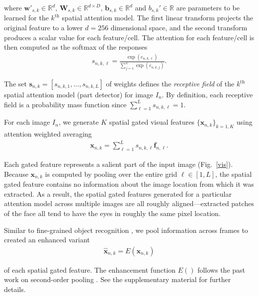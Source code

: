\noindent where $\mathbf{w}'_{s,k} \in \mathbb{R}^{d}$, $\mathbf{W}_{s,k} \in \mathbb{R}^{d \times D}$, $\mathbf{b}_{s,k} \in \mathbb{R}^{d}$ and $b_{s,k}' \in \mathbb{R}$ are parameters to be learned for the $k^\text{th}$ spatial attention model. The first linear transform projects the original feature to a lower $d=256$ dimensional space, and the second transform produces a scalar value for each feature/cell. The attention for each feature/cell is then computed as the softmax of the responses
%
\begin{align}
s_{n,k,\ell} = \frac{\exp(e_{n,k,\ell})}{\sum_{j=1}^L \exp(e_{n,k,j})}.
\end{align}


The set $\mathbf{s}_{n,k} = [ s_{n,k,1}, \ldots, s_{n,k,L}]$ of weights defines the \textit{receptive field} of the $k^\text{th}$ spatial attention model (part detector) for image $I_n$. By definition, each receptive field is a probability mass function since $\sum_{\ell=1}^{L} s_{n,k,\ell} = 1$.  %


For each image $I_n$, we generate $K$ spatial gated visual features $\{ \mathbf{x}_{n,k} \}_{k=1,K}$ using attention weighted averaging
\begin{align}
   \mathbf{x}_{n,k} = \sum_{\ell=1}^L s_{n,k,\ell} \mathbf{f}_{n,\ell}.
\label{eqn:spatial-attention}
\end{align}

\noindent Each gated feature represents a salient part of the input image (Fig.~\ref{vis}).  Because $\mathbf{x}_{n,k}$ is computed by pooling over the entire grid $\ell \in [1,L]$, the spatial gated feature contains no information about the image location from which it was extracted.  As a result, the spatial gated features generated for a particular attention model across multiple images are all roughly aligned---\eg extracted patches of the face all tend to have the eyes in roughly the same pixel location.

Similar to fine-grained object recognition \cite{lin2017bilinear}, we pool information across frames to created an enhanced variant 
%
\begin{align}
\widehat{\mathbf{x}}_{n,k} = E(\mathbf{x}_{n,k})
\label{eqn:enhancement}
\end{align} 

\noindent of each spatial gated feature. 
The enhancement function $E()$ follows the past work on second-order pooling \cite{Carreira2012}. 
See the supplementary material for further details.


